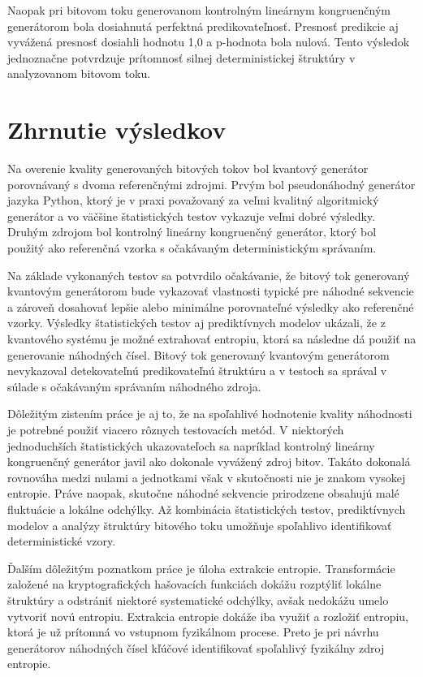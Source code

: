 Naopak pri bitovom toku generovanom kontrolným lineárnym kongruenčným generátorom bola dosiahnutá perfektná predikovateľnosť.
Presnosť predikcie aj vyvážená presnosť dosiahli hodnotu 1,0 a p-hodnota bola nulová.
Tento výsledok jednoznačne potvrdzuje prítomnosť silnej deterministickej štruktúry v analyzovanom bitovom toku.



\section{Zhrnutie výsledkov}


Na overenie kvality generovaných bitových tokov bol kvantový generátor porovnávaný s dvoma referenčnými zdrojmi.
Prvým bol pseudonáhodný generátor jazyka Python, ktorý je v praxi považovaný za veľmi kvalitný algoritmický generátor a vo väčšine štatistických testov vykazuje veľmi dobré výsledky.
Druhým zdrojom bol kontrolný lineárny kongruenčný generátor, ktorý bol použitý ako referenčná vzorka s očakávaným deterministickým správaním.

Na základe vykonaných testov sa potvrdilo očakávanie, že bitový tok generovaný kvantovým generátorom bude vykazovať vlastnosti typické pre náhodné sekvencie a zároveň dosahovať lepšie alebo minimálne porovnateľné výsledky ako referenčné vzorky.
Výsledky štatistických testov aj prediktívnych modelov ukázali, že z kvantového systému je možné extrahovať entropiu, ktorá sa následne dá použiť na generovanie náhodných čísel.
Bitový tok generovaný kvantovým generátorom nevykazoval detekovateľnú predikovateľnú štruktúru a v testoch sa správal v súlade s očakávaným správaním náhodného zdroja.

Dôležitým zistením práce je aj to, že na spoľahlivé hodnotenie kvality náhodnosti je potrebné použiť viacero rôznych testovacích metód.
V niektorých jednoduchších štatistických ukazovateľoch sa napríklad kontrolný lineárny kongruenčný generátor javil ako dokonale vyvážený zdroj bitov.
Takáto dokonalá rovnováha medzi nulami a jednotkami však v skutočnosti nie je znakom vysokej entropie.
Práve naopak, skutočne náhodné sekvencie prirodzene obsahujú malé fluktuácie a lokálne odchýlky.
Až kombinácia štatistických testov, prediktívnych modelov a analýzy štruktúry bitového toku umožňuje spoľahlivo identifikovať deterministické vzory.

Ďalším dôležitým poznatkom práce je úloha extrakcie entropie.
Transformácie založené na kryptografických hašovacích funkciách dokážu rozptýliť lokálne štruktúry a odstrániť niektoré systematické odchýlky, avšak nedokážu umelo vytvoriť novú entropiu.
Extrakcia entropie dokáže iba využiť a rozložiť entropiu, ktorá je už prítomná vo vstupnom fyzikálnom procese.
Preto je pri návrhu generátorov náhodných čísel kľúčové identifikovať spoľahlivý fyzikálny zdroj entropie.


